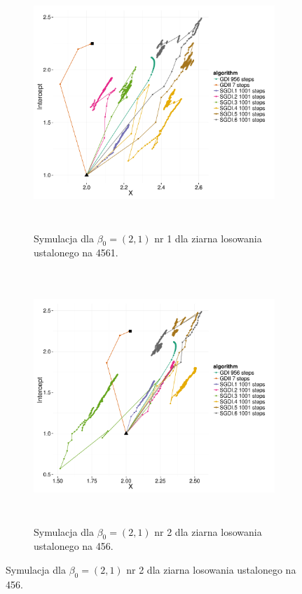\begin{figure}[hbt!]
  \begin{center}
   \begin{subfigure}[h!]{0.9\textwidth}
      \includegraphics[width=\textwidth, height=270pt]{Obrazki/sgd_2_1_1.pdf}
      \caption{Symulacja dla $\beta_0 = (2,1)$ nr 1 dla ziarna losowania ustalonego na 4561.}
   \end{subfigure}     
   \begin{subfigure}[h!]{0.9\textwidth}
      \includegraphics[width=\textwidth, height=270pt]{Obrazki/sgd_2_1_2.pdf}
      \caption{Symulacja dla $\beta_0 = (2,1)$ nr 2 dla ziarna losowania ustalonego na 456.}
   \end{subfigure}  \end{center}

\end{figure}
